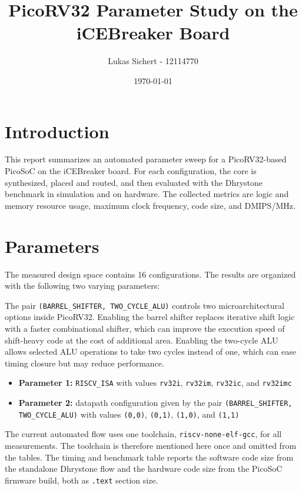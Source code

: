 \documentclass[a4paper,11pt]{article}
\title{PicoRV32 Parameter Study on the iCEBreaker Board}
\author{Lukas Sichert -   12114770}
\date{\today}
\begin{document}
\maketitle

\section*{Introduction}
This report summarizes an automated parameter sweep for a PicoRV32-based PicoSoC on the iCEBreaker board. For each configuration, the core is synthesized, placed and routed, and then evaluated with the Dhrystone benchmark in simulation and on hardware. The collected metrics are logic and memory resource usage, maximum clock frequency, code size, and DMIPS/MHz.

\section*{Parameters}
The measured design space contains 16 configurations. The results are organized with the following two varying parameters:

The pair \texttt{(BARREL\_SHIFTER, TWO\_CYCLE\_ALU)} controls two microarchitectural options inside PicoRV32. Enabling the barrel shifter replaces iterative shift logic with a faster combinational shifter, which can improve the execution speed of shift-heavy code at the cost of additional area. Enabling the two-cycle ALU allows selected ALU operations to take two cycles instead of one, which can ease timing closure but may reduce performance.

\begin{itemize}
	\item \textbf{Parameter 1:} \texttt{RISCV\_ISA} with values \texttt{rv32i}, \texttt{rv32im}, \texttt{rv32ic}, and \texttt{rv32imc}
	\item \textbf{Parameter 2:} datapath configuration given by the pair \texttt{(BARREL\_SHIFTER, TWO\_CYCLE\_ALU)} with values \texttt{(0,0)}, \texttt{(0,1)}, \texttt{(1,0)}, and \texttt{(1,1)}
\end{itemize}

The current automated flow uses one toolchain, \texttt{riscv-none-elf-gcc}, for all measurements. The toolchain is therefore mentioned here once and omitted from the tables. The timing and benchmark table reports the software code size from the standalone Dhrystone flow and the hardware code size from the PicoSoC firmware build, both as \texttt{.text} section size.
\end{document}
